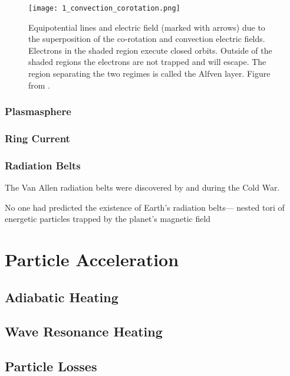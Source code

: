 \begin{figure}
\texttt{[image: 1\_convection\_corotation.png]}
\caption{Equipotential lines and electric field (marked with arrows) due to the superposition of the co-rotation and convection electric fields. Electrons in the shaded region execute closed orbits. Outside of the shaded regions the electrons are not trapped and will escape. The region separating the two regimes is called the Alfven layer. Figure from \citet{Baumjohann1997}.}
\label{Intro:E_fields}
\end{figure}

\subsubsection{Plasmasphere}

\subsubsection{Ring Current}

\subsubsection{Radiation Belts}\label{Intro:radiation_belt}
The Van Allen radiation belts were discovered by \citet{Allen1959} and \citet{Vernov1960} during the Cold War.

 No one had predicted the
existence of Earth’s radiation belts—
nested tori of energetic particles trapped
by the planet’s magnetic field

\section{Particle Acceleration}\label{Intro:acceleration}

\subsection{Adiabatic Heating}\label{Intro:adiabatic_heating}

\subsection{Wave Resonance Heating}\label{Intro:wave_heating}

\subsection{Particle Losses}\label{Intro:acceleration}

